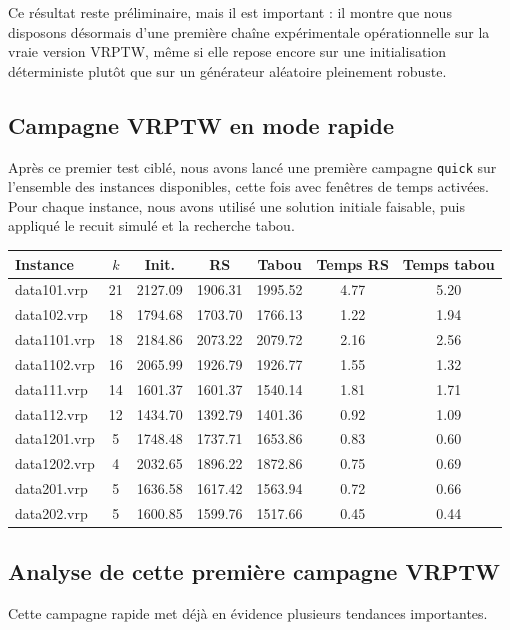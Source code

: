 \documentclass[11pt,a4paper]{article}
\begin{document}
Ce résultat reste préliminaire, mais il est important : il montre que nous disposons désormais d'une première chaîne expérimentale opérationnelle sur la vraie version VRPTW, même si elle repose encore sur une initialisation déterministe plutôt que sur un générateur aléatoire pleinement robuste.

\subsection{Campagne VRPTW en mode rapide}
Après ce premier test ciblé, nous avons lancé une première campagne \texttt{quick} sur l'ensemble des instances disponibles, cette fois avec fenêtres de temps activées. Pour chaque instance, nous avons utilisé une solution initiale faisable, puis appliqué le recuit simulé et la recherche tabou.

\begin{center}
\begin{tabular}{lcccccc}
\toprule
Instance & \(k\) & Init. & RS & Tabou & Temps RS & Temps tabou \\
\midrule
data101.vrp  & 21 & 2127.09 & 1906.31 & 1995.52 & 4.77 & 5.20 \\  %
data102.vrp  & 18 & 1794.68 & 1703.70 & 1766.13 & 1.22 & 1.94 \\
data1101.vrp & 18 & 2184.86 & 2073.22 & 2079.72 & 2.16 & 2.56 \\
data1102.vrp & 16 & 2065.99 & 1926.79 & 1926.77 & 1.55 & 1.32 \\
data111.vrp  & 14 & 1601.37 & 1601.37 & 1540.14 & 1.81 & 1.71 \\
data112.vrp  & 12 & 1434.70 & 1392.79 & 1401.36 & 0.92 & 1.09 \\
data1201.vrp & 5  & 1748.48 & 1737.71 & 1653.86 & 0.83 & 0.60 \\
data1202.vrp & 4  & 2032.65 & 1896.22 & 1872.86 & 0.75 & 0.69 \\
data201.vrp  & 5  & 1636.58 & 1617.42 & 1563.94 & 0.72 & 0.66 \\
data202.vrp  & 5  & 1600.85 & 1599.76 & 1517.66 & 0.45 & 0.44 \\
\bottomrule
\end{tabular}
\end{center}

\subsection{Analyse de cette première campagne VRPTW}
Cette campagne rapide met déjà en évidence plusieurs tendances importantes.
\end{document}
